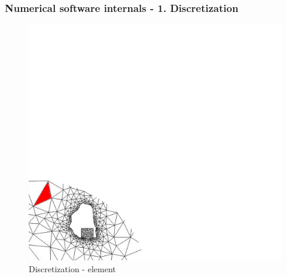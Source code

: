 \documentclass{beamer}
\begin{document}
\begin{frame}
\large
\frametitle{Numerical software internals - 1. Discretization}
\begin{figure}[!ht]
\vspace{-1mm}
\begin{center}
\includegraphics[height=0.8\textheight]{internals2.png}
\caption{Discretization - element}
\end{center}
\noindent
\vspace{-4mm}
\end{figure}
\end{frame}
\end{document}

